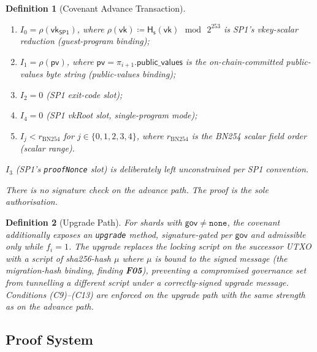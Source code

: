 \documentclass[11pt,a4paper]{article}
\newtheorem{definition}{Definition}[section]
\newcommand{\Hashs}{\mathsf{H_s}}        %
\newcommand{\SPone}{\mathsf{SP1}}
\newcommand{\vkSP}{\mathsf{vk}_{\SPone}}           %
\begin{document}
\begin{definition}[Covenant Advance Transaction]
\begin{enumerate}[nosep,label=(C\arabic*),start=9]
    \item $I_0 = \rho(\vkSP)$, where $\rho(\mathsf{vk}) \coloneqq \Hashs(\mathsf{vk}) \,\bmod\, 2^{253}$ is SP1's vkey-scalar reduction \hfill (guest-program binding);
    \item $I_1 = \rho(\mathsf{pv})$, where $\mathsf{pv} = \pi_{i+1}.\mathsf{public\_values}$ is the on-chain-committed public-values byte string \hfill (public-values binding);
    \item $I_2 = 0$ \hfill (SP1 exit-code slot);
    \item $I_4 = 0$ \hfill (SP1 vkRoot slot, single-program mode);
    \item $I_j < r_{\mathrm{BN254}}$ for $j \in \{0, 1, 2, 3, 4\}$, where $r_{\mathrm{BN254}}$ is the BN254 scalar field order \hfill (scalar range).
\end{enumerate}
$I_3$ (SP1's \texttt{proofNonce} slot) is deliberately left unconstrained per SP1 convention.

There is no signature check on the advance path. The proof is the sole authorisation.
\end{definition}

\begin{definition}[Upgrade Path]\label{def:upgrade}
For shards with $\mathsf{gov} \neq \mathtt{none}$, the covenant additionally exposes an \texttt{upgrade} method, signature-gated per $\mathsf{gov}$ and admissible only while $f_i = 1$. The upgrade replaces the locking script on the successor UTXO with a script of sha256-hash $\mu$ where $\mu$ is bound to the signed message (the \emph{migration-hash} binding, finding \textbf{F05}), preventing a compromised governance set from tunnelling a different script under a correctly-signed upgrade message. Conditions (C9)--(C13) are enforced on the upgrade path with the same strength as on the advance path.
\end{definition}

\subsection{Proof System}
\end{document}

